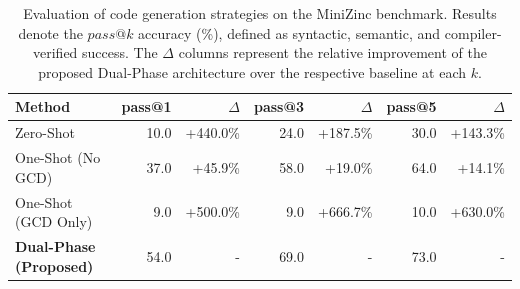 \begin{table}[htbp]
  \centering
  \caption{Evaluation of code generation strategies on the MiniZinc benchmark. Results denote the $pass@k$ accuracy (\%), defined as syntactic, semantic, and compiler-verified success. The $\Delta$ columns represent the relative improvement of the proposed Dual-Phase architecture over the respective baseline at each $k$.}
  \label{tab:pass_at_k}
  \begin{tabular}{l r r r r r r}
    \toprule
    \textbf{Method} & \textbf{pass@1} & \textbf{$\Delta$} & \textbf{pass@3} & \textbf{$\Delta$} & \textbf{pass@5} & \textbf{$\Delta$} \\
    \midrule
    Zero-Shot & 10.0 & +440.0\% & 24.0 & +187.5\% & 30.0 & +143.3\% \\
    One-Shot (No GCD) & 37.0 & +45.9\% & 58.0 & +19.0\% & 64.0 & +14.1\% \\
    One-Shot (GCD Only) & 9.0 & +500.0\% & 9.0 & +666.7\% & 10.0 & +630.0\% \\
    \textbf{Dual-Phase (Proposed)} & 54.0 & - & 69.0 & - & 73.0 & - \\
    \bottomrule
  \end{tabular}
\end{table}